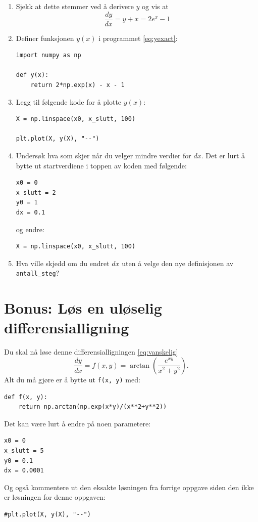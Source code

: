 \documentclass[a4paper,12pt]{article}
\begin{document}
\begin{enumerate}[label=\alph*)]
\item Sjekk at dette stemmer ved å derivere $y$ og vis at 
\[
\frac{dy}{dx} = y + x = 2e^{x} - 1
\]

\item Definer funksjonen $y(x)$ i programmet \eqref{eq:yexact}:
\begin{lstlisting}
import numpy as np

def y(x):
    return 2*np.exp(x) - x - 1
\end{lstlisting}

\item Legg til følgende kode for å plotte $y(x)$:
\begin{lstlisting}
X = np.linspace(x0, x_slutt, 100)

plt.plot(X, y(X), "--")
\end{lstlisting}

\item Undersøk hva som skjer når du velger mindre verdier for $dx$. Det er lurt å bytte ut startverdiene i toppen av koden med følgende:
\begin{lstlisting}
x0 = 0
x_slutt = 2
y0 = 1
dx = 0.1
\end{lstlisting}
og endre:
\begin{lstlisting}
X = np.linspace(x0, x_slutt, 100)
\end{lstlisting}

\item Hva ville skjedd om du endret $dx$ uten å velge den nye definisjonen av \lstinline|antall_steg|?

\end{enumerate}

\section*{Bonus: Løs en uløselig differensialligning}

Du skal nå løse denne differensialligningen \eqref{eq:vanskelig}
\begin{equation*}
\frac{dy}{dx} = f(x,y) = \arctan{\left( \frac{e^{xy}}{x^2+y^2} \right)}.
\end{equation*}
Alt du må gjøre er å bytte ut \lstinline|f(x, y)| med:
\begin{lstlisting}
def f(x, y):
    return np.arctan(np.exp(x*y)/(x**2+y**2))
\end{lstlisting}
Det kan være lurt å endre på noen parametere:
\begin{lstlisting}
x0 = 0
x_slutt = 5
y0 = 0.1
dx = 0.0001
\end{lstlisting}
Og også kommentere ut den eksakte løsningen fra forrige oppgave siden den ikke er løsningen for denne oppgaven:
\begin{lstlisting}
#plt.plot(X, y(X), "--")
\end{lstlisting}
\end{document}
